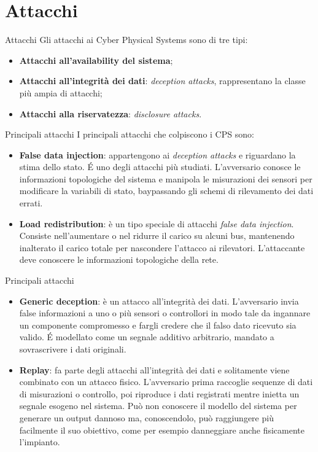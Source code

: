 \documentclass{beamer}
\begin{document}
\section{Attacchi}

\begin{frame}{Attacchi}
Gli attacchi ai Cyber Physical Systems sono di tre tipi:
\begin{itemize}
    \item \textbf{Attacchi all'availability del sistema}; 
    \item \textbf{Attacchi all'integrità dei dati}: \textit{deception attacks}, rappresentano la classe più ampia di attacchi;
    \item \textbf{Attacchi alla riservatezza}: \textit{disclosure attacks}.
\end{itemize}

\end{frame}

\begin{frame}{Principali attacchi}
I principali attacchi che colpiscono i CPS sono:
\begin{itemize}
    \item \textbf{False data injection}: appartengono ai \textit{deception attacks} e riguardano la stima dello stato. \'E uno degli attacchi più studiati. 
    L'avversario conosce le informazioni topologiche del sistema e manipola le misurazioni dei sensori per modificare la variabili di stato, 
    baypassando gli schemi di rilevamento dei dati errati.
    \item \textbf{Load redistribution}: è un tipo speciale di attacchi \textit{false data injection}. Consiste nell'aumentare o nel ridurre 
    il carico su alcuni bus, mantenendo inalterato il carico totale per nascondere l'attacco ai rilevatori. L'attaccante deve conoscere le informazioni
    topologiche della rete.
\end{itemize}
\end{frame}

\begin{frame}{Principali attacchi}
\begin{itemize}
    \item \textbf{Generic deception}: è un attacco all'integrità dei dati. L'avversario invia false informazioni a uno o più sensori o controllori 
    in modo tale da ingannare un componente compromesso e fargli credere che il falso dato ricevuto sia valido.
    \'E modellato come un segnale additivo arbitrario, mandato a sovrascrivere i dati originali.
    \item \textbf{Replay}: fa parte degli attacchi all'integrità dei dati e solitamente viene combinato con un attacco fisico. L'avversario prima 
    raccoglie sequenze di dati di misurazioni o controllo, poi riproduce i dati registrati mentre inietta un segnale esogeno nel sistema. 
    Può non conoscere il modello del sistema per generare un output dannoso ma, conoscendolo, può raggiungere più facilmente il suo obiettivo, 
    come per esempio danneggiare anche fisicamente l'impianto.
\end{itemize}
\end{frame}
\end{document}
